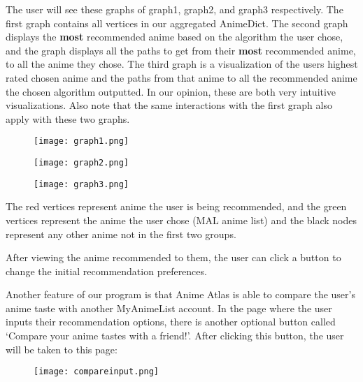 \documentclass[fontsize=11pt]{article}
\begin{document}
\newpage
\item[]The user will see these graphs of graph1, graph2, and graph3 respectively. The first graph contains all vertices in our aggregated AnimeDict. The second graph displays the \textbf{most} recommended anime based on the algorithm the user chose, and the graph displays all the paths to get from their \textbf{most} recommended anime, to all the anime they chose. The third graph is a visualization of the users highest rated chosen anime and the paths from that anime to all the recommended anime the chosen algorithm outputted. In our opinion, these are both very intuitive visualizations. Also note that the same interactions with the first graph also apply with these two graphs.  

\begin{figure}[htp]
    \centering
    \texttt{[image: graph1.png]}
\end{figure}

\begin{figure}[htp]
    \centering
    \texttt{[image: graph2.png]}
\end{figure}

\begin{figure}[htp]
    \centering
    \texttt{[image: graph3.png]}
\end{figure}

\newpage

\item[] The red vertices represent anime the user is being recommended, and the green vertices represent the anime the user chose (MAL anime list) and the black nodes represent any other anime not in the first two groups.

\item[] After viewing the anime recommended to them, the user can click a button to change the initial recommendation preferences. 

\item[] Another feature of our program is that Anime Atlas is able to compare the user's anime taste with another MyAnimeList account. In the page where the user inputs their recommendation options, there is another optional button called `Compare your anime tastes with a friend!'. After clicking this button, the user will be taken to this page:

\begin{figure}[htp]
    \centering
    \texttt{[image: compareinput.png]}
\end{figure}
\end{document}
